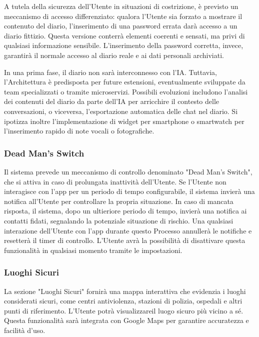 \documentclass[a4paper,12pt]{article}
\begin{document}
A tutela della sicurezza dell'Utente in situazioni di costrizione, è previsto un meccanismo di accesso differenziato: qualora l'Utente sia forzato a mostrare il contenuto del diario, l'inserimento di una password errata darà accesso a un diario fittizio. Questa versione conterrà elementi coerenti e sensati, ma privi di qualsiasi informazione sensibile. L'inserimento della password corretta, invece, garantirà il normale accesso al diario reale e ai dati personali archiviati.

In una prima fase, il diario non sarà interconnesso con l'IA.
Tuttavia, l'Architettura è predisposta per future estensioni, eventualmente sviluppate da team specializzati o tramite microservizi. Possibili evoluzioni includono l'analisi dei contenuti del diario da parte dell'IA per arricchire il contesto delle conversazioni, o viceversa, l'esportazione automatica delle chat nel diario. Si ipotizza inoltre l'implementazione di widget per smartphone o smartwatch per l'inserimento rapido di note vocali o fotografiche.

\subsubsection{Dead Man's Switch}
Il sistema prevede un meccanismo di controllo denominato "Dead Man's Switch", che si attiva in caso di prolungata inattività dell'Utente. Se l'Utente non interagisce con l'app per un periodo di tempo configurabile, il sistema invierà una notifica all'Utente per controllare la propria situazione. In caso di mancata risposta, il sistema, dopo un ultieriore periodo di tempo, invierà una notifica ai contatti fidati, segnalando la potenziale situazione di rischio. Una qualsiasi interazione dell'Utente con l'app durante questo Processo annullerà le notifiche e resetterà il timer di controllo.
L'Utente avrà la possibilità di disattivare questa funzionalità in qualsiasi momento tramite le impostazioni.

\subsubsection{Luoghi Sicuri}
La sezione "Luoghi Sicuri" fornirà una mappa interattiva che evidenzia i luoghi considerati sicuri, come centri antiviolenza, stazioni di polizia, ospedali e altri punti di riferimento. L'Utente potrà visualizzareil luogo sicuro più vicino a sé. Questa funzionalità sarà integrata con Google Maps per garantire accuratezza e facilità d'uso.

\end{document}

